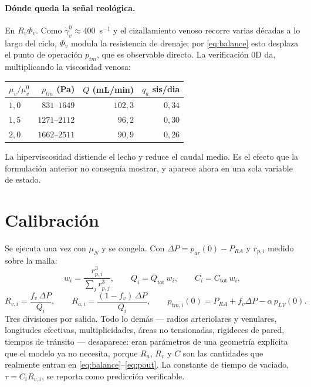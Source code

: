 \documentclass[11pt]{article}
\begin{document}
\paragraph{D\'onde queda la se\~nal reol\'ogica.} En $R_v\Phi_v$. Como
$\dot\gamma_v^{0}\approx400$~s$^{-1}$ y el cizallamiento venoso recorre varias
d\'ecadas a lo largo del ciclo, $\Phi_v$ modula la resistencia de drenaje; por
\eqref{eq:balance} esto desplaza el punto de operaci\'on $p_{tm}$, que es
observable directo. La verificaci\'on 0D da, multiplicando la viscosidad
venosa:
\begin{center}\small
\begin{tabular}{lrrr}
\toprule
$\mu_v/\mu_v^{0}$ & $p_{tm}$ (Pa) & $Q$ (mL/min) & $q_a$ sis/dia\\
\midrule
$1{,}0$ & $831$--$1649$ & $102{,}3$ & $0{,}34$\\
$1{,}5$ & $1271$--$2112$ & $96{,}2$ & $0{,}30$\\
$2{,}0$ & $1662$--$2511$ & $90{,}9$ & $0{,}26$\\
\bottomrule
\end{tabular}
\end{center}
\noindent
La hiperviscosidad distiende el lecho y reduce el caudal medio. Es el efecto
que la formulaci\'on anterior no consegu\'ia mostrar, y aparece ahora en una
sola variable de estado.

\section{Calibraci\'on}

Se ejecuta una vez con $\mu_N$ y se congela. Con
$\Delta P=p_{ar}(0)-P_{RA}$ y $r_{p,i}$ medido sobre la malla:
\begin{equation}
  w_i=\frac{r_{p,i}^{3}}{\sum_j r_{p,j}^{3}},
  \qquad
  Q_i=Q_{\text{tot}}\,w_i,
  \qquad
  C_i=C_{\text{tot}}\,w_i,
  \label{eq:cal1}
\end{equation}
\begin{equation}
  R_{v,i}=\frac{f_v\,\Delta P}{Q_i},
  \qquad
  R_{a,i}=\frac{(1-f_v)\,\Delta P}{Q_i},
  \qquad
  p_{tm,i}(0)=P_{RA}+f_v\Delta P-\alpha\,p_{LV}(0).
  \label{eq:cal2}
\end{equation}
Tres divisiones por salida. Todo lo dem\'as --- radios arteriolares y
venulares, longitudes efectivas, multiplicidades, \'areas no tensionadas,
rigideces de pared, tiempos de tr\'ansito --- desaparece: eran par\'ametros de
una geometr\'ia expl\'icita que el modelo ya no necesita, porque
$R_a$, $R_v$ y $C$ son las cantidades que realmente entran en
\eqref{eq:balance}--\eqref{eq:pout}. La constante de tiempo de vaciado,
$\tau=C_iR_{v,i}$, se reporta como predicci\'on verificable.
\end{document}
